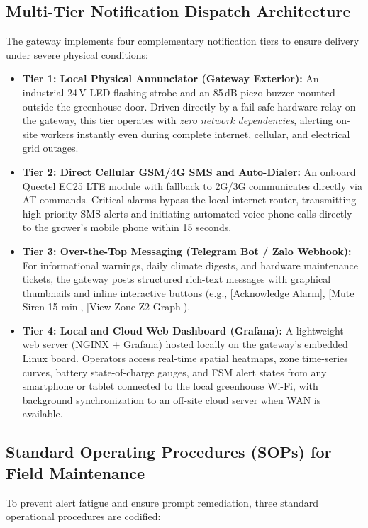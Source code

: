 \documentclass[11pt,a4paper]{report}
\begin{document}
\subsection{Multi-Tier Notification Dispatch Architecture}
The gateway implements four complementary notification tiers to ensure delivery under severe physical conditions:
\begin{itemize}
  \item \textbf{Tier 1: Local Physical Annunciator (Gateway Exterior):} An industrial 24\,V LED flashing strobe and an 85\,dB piezo buzzer mounted outside the greenhouse door. Driven directly by a fail-safe hardware relay on the gateway, this tier operates with \emph{zero network dependencies}, alerting on-site workers instantly even during complete internet, cellular, and electrical grid outages.
  \item \textbf{Tier 2: Direct Cellular GSM/4G SMS and Auto-Dialer:} An onboard Quectel EC25 LTE module with fallback to 2G/3G communicates directly via AT commands. Critical alarms bypass the local internet router, transmitting high-priority SMS alerts and initiating automated voice phone calls directly to the grower's mobile phone within 15 seconds.
  \item \textbf{Tier 3: Over-the-Top Messaging (Telegram Bot / Zalo Webhook):} For informational warnings, daily climate digests, and hardware maintenance tickets, the gateway posts structured rich-text messages with graphical thumbnails and inline interactive buttons (e.g., \textsf{[Acknowledge Alarm]}, \textsf{[Mute Siren 15 min]}, \textsf{[View Zone Z2 Graph]}).
  \item \textbf{Tier 4: Local and Cloud Web Dashboard (Grafana):} A lightweight web server (NGINX + Grafana) hosted locally on the gateway's embedded Linux board. Operators access real-time spatial heatmaps, zone time-series curves, battery state-of-charge gauges, and FSM alert states from any smartphone or tablet connected to the local greenhouse Wi-Fi, with background synchronization to an off-site cloud server when WAN is available.
\end{itemize}

\subsection{Standard Operating Procedures (SOPs) for Field Maintenance}
To prevent alert fatigue and ensure prompt remediation, three standard operational procedures are codified:
\end{document}
